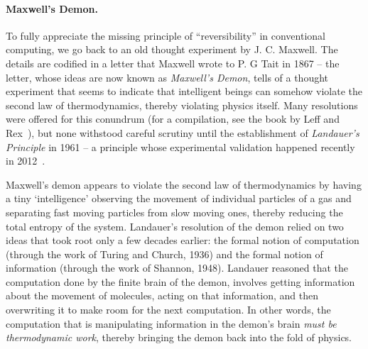 \documentclass{article}
\begin{document}
\begin{comment}
\begin{quote}
  Ed Fredkin pursued the idea that information must be finite in
  density. One day, he announced that things must be even more simple
  than that. He said that he was going to assume that information
  itself is conserved. “You’re out of you mind, Ed.” I
  pronounced. “That’s completely ridiculous. Nothing could happen in
  such a world. There couldn’t even be logical gates. No decisions
  could ever be made.” But when Fredkin gets one of his ideas, he’s
  quite immune to objections like that; indeed, they fuel him with
  energy. Soon he went on to assume that information processing must
  also be reversible — and invented what’s now called the Fredkin
  gate. (Minsky 1999)

  In other terms, what is so good in logic that quantum physics should
  obey?  Can't we imagine that our conceptions about logic are wrong,
  so wrong that they are unable to cope with the quantum miracle?
  [\ldots] Instead of teaching logic to nature, it is more reasonable
  to learn from her. Instead of interpreting quantum into logic, we
  shall interpret logic into quantum (Girard 2007).
\end{quote}
\end{comment}

\paragraph*{Maxwell's Demon.}
To fully appreciate the missing principle of ``reversibility'' in
conventional computing, we go back to an old thought experiment by
J. C. Maxwell. The details are codified in a letter that Maxwell wrote
to P. G Tait in 1867 -- the letter, whose ideas are now known as
\emph{Maxwell's Demon}, tells of a thought experiment that seems to
indicate that intelligent beings can somehow violate the second law of
thermodynamics, thereby violating physics itself. Many resolutions
were offered for this conundrum (for a compilation, see the book by
Leff and Rex~\cite{leff1990}), but none withstood careful scrutiny
until the establishment of \emph{Landauer's Principle} in 1961 -- a
principle whose experimental validation happened recently in
2012~\cite{berut2012experimental}.

Maxwell's demon appears to violate the second law of thermodynamics by
having a tiny `intelligence' observing the movement of individual
particles of a gas and separating fast moving particles from slow
moving ones, thereby reducing the total entropy of the
system. Landauer's resolution of the demon relied on two ideas that
took root only a few decades earlier: the formal notion of computation
(through the work of Turing and Church, 1936) and the formal notion of
information (through the work of Shannon, 1948). Landauer reasoned
that the computation done by the finite brain of the demon, involves
getting information about the movement of molecules, acting on that
information, and then overwriting it to make room for the next
computation.  In other words, the computation that is manipulating
information in the demon's brain \textit{must be thermodynamic work},
thereby bringing the demon back into the fold of physics.
\end{document}
